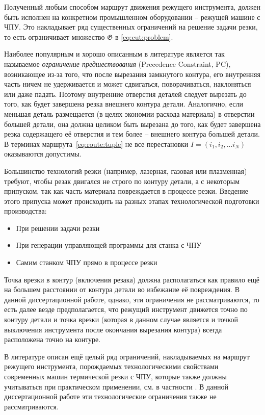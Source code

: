 Полученный любым способом
маршрут движения режущего инструмента,
должен быть исполнен
на конкретном промышленном оборудовании --
режущей машине с ЧПУ.
Это накладывает ряд
существенных ограничений
на решение задачи резки,
то есть ограничивает множество
$\mathfrak G$ в \eqref{eq:cut:problem}.

Наиболее популярным и хорошо описанным в литературе
является так называемое
{\it ограничение предшествования}
(Precedence Constraint, PC),
возникающее из-за того,
что
после вырезания замкнутого контура,
его внутренняя часть ничем не удерживается
и может сдвигаться, поворачиваться, наклоняться
или даже падать.
Поэтому внутренние отверстия деталей следует
вырезать до того,
как будет завершена резка
внешнего контура детали.
Аналогично,
если меньшая деталь размещается
(в целях экономии расхода материала)
в отверстии большей детали,
она должна целиком быть вырезана
до того,
как будет завершена резка
содержащего её отверстия
и тем более --
внешнего контура большей детали.
В терминах маршрута~\eqref{eq:route:tuple}
не все перестановки
$I = (i_1, i_2, ... i_N)$
оказываются допустимы.

Большинство технологий резки
(например, лазерная, газовая или плазменная)
требуют,
чтобы резак двигался не строго по контуру детали,
а с некоторым припуском,
так как часть материала повреждается в процессе резки.
Введение этого припуска может происходить
на разных этапах технологической подготовки производства:
\begin{itemize}
  \item
  При решении задачи резки
  \item
  При генерации управляющей программы для станка с ЧПУ
  \item
  Самим станком ЧПУ прямо в процессе резки
\end{itemize}

Точка врезки в контур
(включения резака)
должна располагаться
как правило ещё на большем расстоянии
от контура детали
во избежание её повреждения.
В данной диссертационной работе,
однако,
эти ограничения не рассматриваются,
то есть
далее везде предполагается,
что режущий инструмент движется точно по контуру детали
и точка врезки
(которая в данном случае
является и точкой выключения инструмента
после окончания вырезания контура)
всегда расположена точно на контуре.

В литературе описан
ещё целый ряд ограничений,
накладываемых на маршрут режущего инструмента,
порождаемых
технологическими свойствами
современных машин термической резки с ЧПУ,
которые также должны учитываться
при практическом применении,
см. в частности
\cite{Sozopol,Miskolc}.
В данной диссертационной работе
эти технологические ограничения также не рассматриваются.
